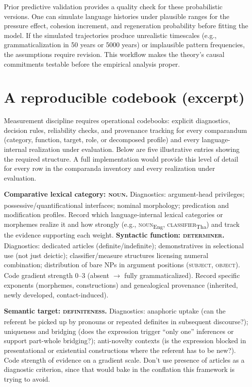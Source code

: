 \documentclass[12pt]{article}
\begin{document}
Prior predictive validation provides a quality check for these probabilistic versions. One can simulate language histories under plausible ranges for the pressure effect, cohesion increment, and regeneration probability before fitting the model. If the simulated trajectories produce unrealistic timescales (e.g., grammaticalization in 50 years or 5000 years) or implausible pattern frequencies, the assumptions require revision. This workflow makes the theory's causal commitments testable before the empirical analysis proper.

\section{A reproducible codebook (excerpt)}\label{sec:codebook}
Measurement discipline requires operational codebooks: explicit diagnostics, decision rules, reliability checks, and provenance tracking for every comparandum (category, function, target, role, or decomposed profile) and every language-internal realization under evaluation. Below are five illustrative entries showing the required structure. A full implementation would provide this level of detail for every row in the comparanda inventory and every realization under evaluation.


\ea
\ex \textbf{Comparative lexical category: \textsc{noun}\textsubscript{\Cross}.} Diagnostics: argument-head privileges; possessive/quantificational interfaces; nominal morphology; predication and modification profiles. Record which language-internal lexical categories or morphemes realize it and how strongly (e.g., \textsc{noun}\textsubscript{Eng}, \textsc{classifier}\textsubscript{Tha}) and track the evidence supporting each weight.
\ex \textbf{Syntactic function: \textsc{determiner}\textsubscript{\Cross}.} Diagnostics: dedicated articles (definite/indefinite); demonstratives in selectional use (not just deictic); classifier/measure structures licensing numeral combination; distribution of bare NPs in argument positions (\textsc{subject}\textsubscript{\Cross}, \textsc{object}\textsubscript{\Cross}). Code gradient strength 0--3 (absent $\to$ fully grammaticalized). Record specific exponents (morphemes, constructions) and genealogical provenance (inherited, newly developed, contact-induced).

\ex \textbf{Semantic target: \textsc{definiteness}\textsubscript{\Cross}.} Diagnostics: anaphoric uptake (can the referent be picked up by pronouns or repeated definites in subsequent discourse?); uniqueness and bridging (does the expression trigger \enquote{only one} inferences or support part-whole bridging?); anti-novelty contexts (is the expression blocked in presentational or existential constructions where the referent has to be new?). Code strength of evidence on a gradient scale. Don't use presence of articles as a diagnostic criterion, since that would bake in the conflation this framework is trying to avoid.
\end{document}

